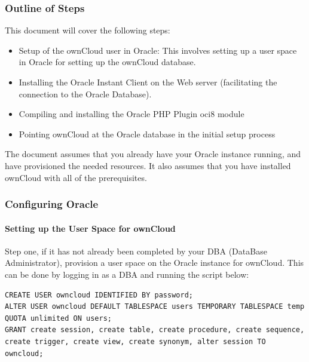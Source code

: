 \documentclass[letterpaper,10pt,english]{sphinxmanual}
\begin{document}
\subsubsection{Outline of Steps}
\label{enterprise_installation/oracle_db_configuration:outline-of-steps}
This document will cover the following steps:
\begin{itemize}
\item {} 
Setup of the ownCloud user in Oracle: This involves setting up a user space
in Oracle for setting up the ownCloud database.

\item {} 
Installing the Oracle Instant Client on the Web server (facilitating the
connection to the Oracle Database).

\item {} 
Compiling and installing the Oracle PHP Plugin oci8 module

\item {} 
Pointing ownCloud at the Oracle database in the initial setup process

\end{itemize}

The document assumes that you already have your Oracle instance running, and
have provisioned the needed resources. It also assumes that you have installed
ownCloud with all of the prerequisites.


\subsubsection{Configuring Oracle}
\label{enterprise_installation/oracle_db_configuration:configuring-oracle}

\paragraph{Setting up the User Space for ownCloud}
\label{enterprise_installation/oracle_db_configuration:setting-up-the-user-space-for-owncloud}
Step one, if it has not already been completed by your \textsc{DBA} (DataBase Administrator), provision a user
space on the Oracle instance for ownCloud.  This can be done by logging in as a
DBA and running the script below:

\begin{Verbatim}[commandchars=\\\{\}]
CREATE USER owncloud IDENTIFIED BY password;
ALTER USER owncloud DEFAULT TABLESPACE users TEMPORARY TABLESPACE temp QUOTA unlimited ON users;
GRANT create session, create table, create procedure, create sequence, create trigger, create view, create synonym, alter session TO owncloud;
\end{Verbatim}
\end{document}
